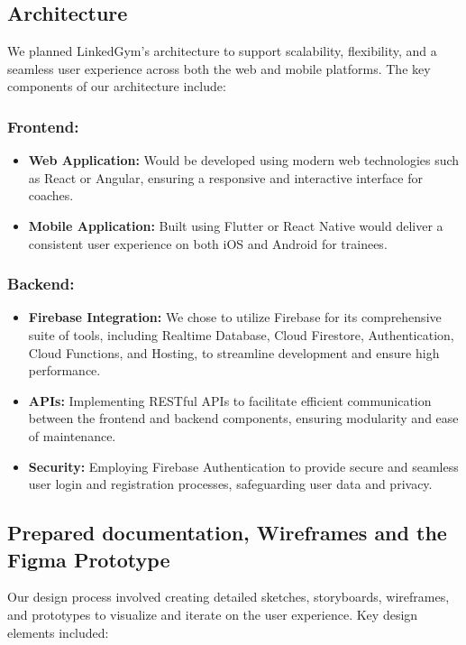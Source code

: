 \subsection{Architecture}
We planned LinkedGym's architecture to support scalability, flexibility, and a seamless user experience across both the web and mobile platforms. The key components of our architecture include:

\subsubsection{Frontend:}
\begin{itemize}
  \item \textbf{Web Application:} Would be developed using modern web technologies such as React or Angular, ensuring a responsive and interactive interface for coaches.
  
  \item \textbf{Mobile Application:} Built using Flutter or React Native would deliver a consistent user experience on both iOS and Android for trainees.
\end{itemize}

\subsubsection{Backend:}
\begin{itemize}
  \item \textbf{Firebase Integration:} We chose to utilize Firebase for its comprehensive suite of tools, including Realtime Database, Cloud Firestore, Authentication, Cloud Functions, and Hosting, to streamline development and ensure high performance.
  
  \item \textbf{APIs:} Implementing RESTful APIs to facilitate efficient communication between the frontend and backend components, ensuring modularity and ease of maintenance.
  
  \item \textbf{Security:} Employing Firebase Authentication to provide secure and seamless user login and registration processes, safeguarding user data and privacy.
\end{itemize}

\subsection{Prepared documentation, Wireframes and the Figma Prototype}
Our design process involved creating detailed sketches, storyboards, wireframes, and prototypes to visualize and iterate on the user experience. Key design elements included:

